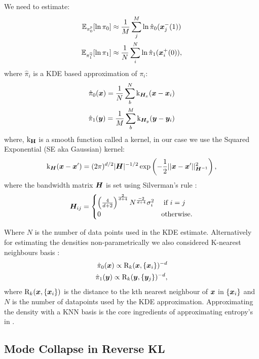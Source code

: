 \documentclass[a4paper,12pt,twoside,openright]{report}
\theoremstyle{definition}
\begin{document}
We need to estimate:
\begin{align*}
\mathbb{E}_{\pi_0^{\mathbb{P}}}[\ln\pi_{0}] &\approx \frac{1}{M}\sum_{j}^{M} \ln \hat{\pi}_0({\bm{x}}_j^{-}(1)) \\
\mathbb{E}_{\pi_1^{\mathbb{Q}}}[\ln\pi_{1}] &\approx \frac{1}{N}\sum_{i}^{N} \ln \hat{\pi}_1({\bm{x}}_i^{+}(0)),
\end{align*}
where $\hat{\pi}_i$ is a KDE based approximation of $\pi_i$:
\begin{align*}
\hat{\pi}_0({\bm{x}}) = \frac{1}{N} \sum_b^{N} {\text{k}}_{{\bm{H}}_x}({\bm{x}} - {\bm{x}}_i) \\
\hat{\pi}_1({\bm{y}}) = \frac{1}{M} \sum_b^{M} {\text{k}}_{{\bm{H}}_y}({\bm{y}} - {\bm{y}}_i)
\end{align*}
where, ${\text{k}}_{\textbf{H}}$ is a smooth function called a kernel, in our case we use the Squared Exponential (SE aka Gaussian) kernel:
\begin{align*}
{\text{k}}_{{\bm{H}}}({\bm{x}}-{\bm{x}}') = (2\pi)^{d/2}|{\bm{H}}|^{-1/2}\exp\left(-\frac{1}{2}||{\bm{x}}-{\bm{x}}'||^{2}_{{\bm{H}}^{-1}}\right),
\end{align*}
where the bandwidth matrix ${\bm{H}}$ is set using Silverman's rule \citep{silverman1986density}:
\begin{align}
{\bm{H}}_{ij} = \begin{cases}
\left(\frac{4}{d+2}\right)^{\frac{2}{d+4}} N^{\frac{-2}{d+4}} \sigma_{i}^2  &\text{  if  } i=j \\
0  &\text{otherwise}.
\end{cases}
\end{align}

Where $N$ is the number of data points used in the KDE estimate. Alternatively for estimating the densities non-parametrically we also considered K-nearest neighbours basis \citep{veksler2013nonparametric}:
\begin{align*}
\hat{\pi}_0({\bm{x}}) \propto  \text{R}_k({\bm{x}}, \{{\bm{x}}_i\})^{-d}\\
\hat{\pi}_1({\bm{y}}) \propto \text{R}_k({\bm{y}}, \{{\bm{y}}_j\})^{-d},
\end{align*}
where $\text{R}_k({\bm{x}}, \{{\bm{x}}_i\})$ is the distance to the kth nearest neighbour of ${\bm{x}}$ in $\{{\bm{x}}_i\}$ and $N$ is the number of datapoints used by the KDE approximation.  Approximating the density with a KNN basis is the core ingredients of approximating entropy's in \cite{singh2016analysis}.

\subsection{Mode Collapse in Reverse KL}
\end{document}

